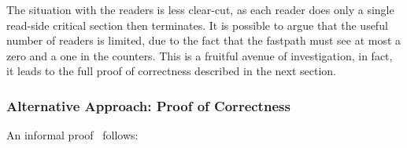 The situation with the readers is less clear-cut, as each reader
does only a single read-side critical section then terminates.
It is possible to argue that the useful number of readers is limited,
due to the fact that the fastpath must see at most a zero and a one
in the counters.
This is a fruitful avenue of investigation, in fact, it leads to
the full proof of correctness described in the next section.

\subsubsection{Alternative Approach:
				     Proof of Correctness}
\label{sec:formal:Alternative Approach: Proof of Correctness}

An informal proof~\cite{PaulMcKenney2007QRCUpatch}
follows:


